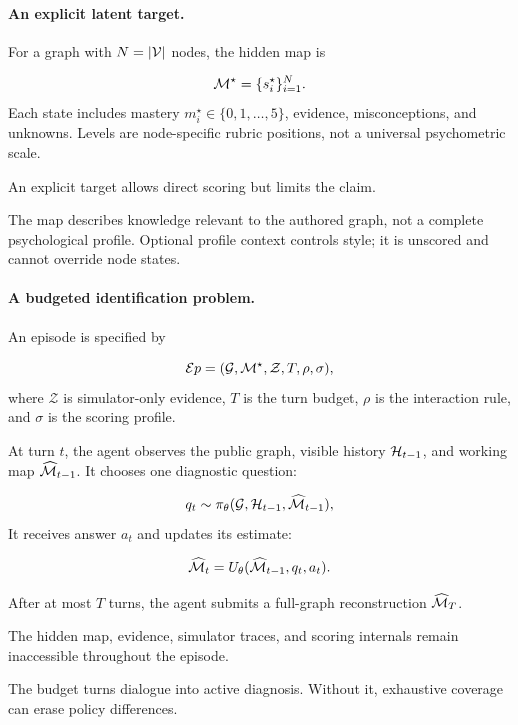 \paragraph{An explicit latent target.}
For a graph with $N = |\mathcal{V}|$ nodes, the hidden map is

\begin{equation}
    \mathcal{M}^{\star} = \{s_i^{\star}\}_{i=1}^{N}.
\end{equation}
Each state includes mastery $m_i^{\star} \in \{0,1,\ldots,5\}$, evidence, misconceptions, and unknowns.
Levels are node-specific rubric positions, not a universal psychometric scale.

An explicit target allows direct scoring but limits the claim.

The map describes knowledge relevant to the authored graph, not a complete psychological profile.
Optional profile context controls style; it is unscored and cannot override node states.

\paragraph{A budgeted identification problem.}
An episode is specified by

\begin{equation}
    \mathcal{E}p = (\mathcal{G}, \mathcal{M}^{\star}, \mathcal{Z}, T, \rho, \sigma),
\end{equation}
where $\mathcal{Z}$ is simulator-only evidence, $T$ is the turn budget, $\rho$ is the interaction rule,
and $\sigma$ is the scoring profile.

At turn $t$, the agent observes the public graph, visible history $\mathcal{H}_{t-1}$, and working map
$\widehat{\mathcal{M}}_{t-1}$. It chooses one diagnostic question:

\begin{equation}
    q_t \sim \pi_{\theta}(\mathcal{G},\mathcal{H}_{t-1},\widehat{\mathcal{M}}_{t-1}),
\end{equation}
It receives answer $a_t$ and updates its estimate:

\begin{equation}
    \widehat{\mathcal{M}}_t = U_{\theta}(\widehat{\mathcal{M}}_{t-1}, q_t, a_t).
\end{equation}

After at most $T$ turns, the agent submits a full-graph reconstruction $\widehat{\mathcal{M}}_T$.

The hidden map, evidence, simulator traces, and scoring internals remain inaccessible throughout the
episode.

The budget turns dialogue into active diagnosis. Without it, exhaustive coverage can erase policy
differences.

